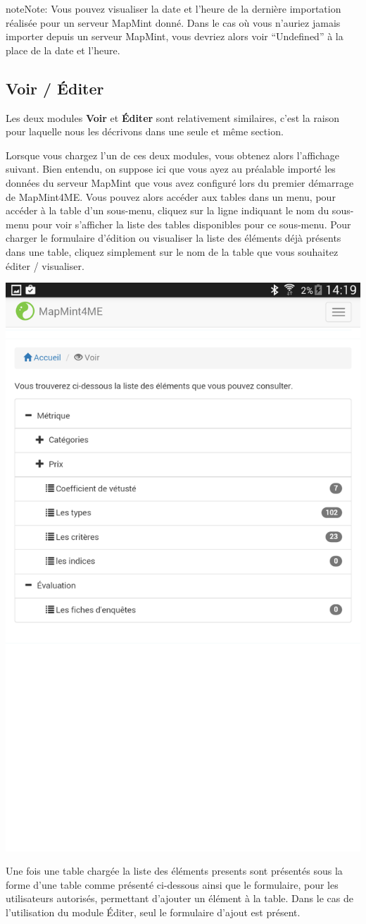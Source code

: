 \documentclass[letterpaper,10pt,french]{sphinxmanual}
\begin{document}
\begin{notice}{note}{Note:}
Vous pouvez visualiser la date et l'heure de la dernière importation réalisée pour un serveur MapMint donné. Dans le cas où vous n'auriez jamais importer depuis un serveur MapMint, vous devriez alors voir ``Undefined'' à la place de la date et l'heure.
\end{notice}


\subsection{Voir / Éditer}
\label{tables/mapmint4me:voir-editer}
Les deux modules \textbf{Voir} et \textbf{Éditer} sont relativement similaires, c'est la raison pour laquelle nous les décrivons dans une seule et même section.

Lorsque vous chargez l'un de ces deux modules, vous obtenez alors l'affichage suivant. Bien entendu, on suppose ici que vous ayez au préalable importé les données du serveur MapMint que vous avez configuré lors du premier démarrage de MapMint4ME. Vous pouvez alors accéder aux tables dans un menu, pour accéder à la table d'un sous-menu, cliquez sur la ligne indiquant le nom du sous-menu pour voir s'afficher la liste des tables disponibles pour ce sous-menu. Pour charger le formulaire d'édition ou visualiser la liste des éléments déjà présents dans une table, cliquez simplement sur le nom de la table que vous souhaitez éditer / visualiser.

{\hfill\includegraphics[width=0.450\linewidth]{mm4me-view-init.png}\hfill}

Une fois une table chargée la liste des éléments presents sont présentés sous la forme d'une table comme présenté ci-dessous ainsi que le formulaire, pour les utilisateurs autorisés, permettant d'ajouter un élément à la table. Dans le cas de l'utilisation du module Éditer, seul le formulaire d'ajout est présent.
\end{document}
